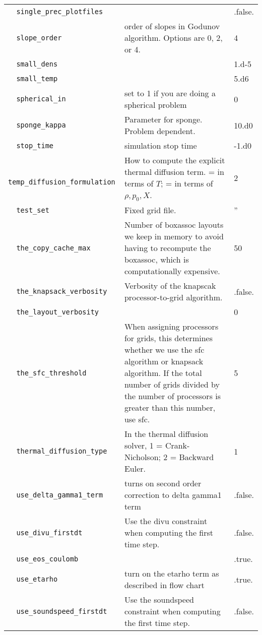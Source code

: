 {\begin{center}
\begin{longtable}{|l|p{3.25in}|l|}
\verb=  single_prec_plotfiles  = &    &  .false. \\
\verb=  slope_order  = &   order of slopes in Godunov algorithm.  Options are 0, 2, or 4.  &  4 \\
\verb=  small_dens  = &    &  1.d-5 \\
\verb=  small_temp  = &    &  5.d6 \\
\verb=  spherical_in  = &   set to 1 if you are doing a spherical problem  &  0 \\
\verb=  sponge_kappa  = &   Parameter for sponge.  Problem dependent.  &  10.d0 \\
\verb=  stop_time  = &   simulation stop time  &  -1.d0 \\
\verb=  temp_diffusion_formulation  = &   How to compute the explicit thermal diffusion term.  \newline 1 = in terms of $T$; \newline 2 = in terms of $\rho,p_0,X$.  &  2 \\
\verb=  test_set  = &   Fixed grid file.  &  '' \\
\verb=  the_copy_cache_max  = &    Number of boxassoc layouts we keep in memory to avoid having to recompute the boxassoc, which is computationally expensive.  &  50 \\
\verb=  the_knapsack_verbosity  = &   Verbosity of the knapscak processor-to-grid algorithm.  &  .false. \\
\verb=  the_layout_verbosity  = &    &  0 \\
\verb=  the_sfc_threshold  = &   When assigning processors for grids, this determines whether we use the sfc algorithm or knapsack algorithm.  If the total number of grids divided by the number of processors is greater than this number, use sfc.  &  5 \\
\verb=  thermal_diffusion_type  = &   In the thermal diffusion solver, 1 = Crank-Nicholson; 2 = Backward Euler.  &  1 \\
\verb=  use_delta_gamma1_term  = &   turns on second order correction to delta gamma1 term  &  .false. \\
\verb=  use_divu_firstdt  = &   Use the divu constraint when computing the first time step.  &  .false. \\
\verb=  use_eos_coulomb  = &    &  .true. \\
\verb=  use_etarho  = &   turn on the etarho term as described in flow chart  &  .true. \\
\verb=  use_soundspeed_firstdt  = &   Use the soundspeed constraint when computing the first time step.  &  .false. \\

\end{longtable}
\end{center}}

